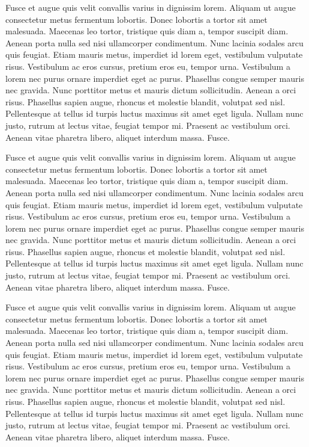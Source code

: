 Fusce et augue quis velit convallis varius in dignissim lorem. 
Aliquam ut augue consectetur metus fermentum lobortis. Donec lobortis 
a tortor sit amet malesuada. Maecenas leo tortor, tristique quis 
diam a, tempor suscipit diam. Aenean porta nulla sed nisi ullamcorper 
condimentum. Nunc lacinia sodales arcu quis feugiat. Etiam mauris 
metus, imperdiet id lorem eget, vestibulum vulputate risus. Vestibulum 
ac eros cursus, pretium eros eu, tempor urna. Vestibulum a lorem 
nec purus ornare imperdiet eget ac purus. Phasellus congue semper 
mauris nec gravida. Nunc porttitor metus et mauris dictum sollicitudin.
Aenean a orci risus. Phasellus sapien augue, rhoncus et molestie blandit, 
volutpat sed nisl. Pellentesque at tellus id turpis luctus maximus 
sit amet eget ligula. Nullam nunc justo, rutrum at lectus vitae, 
feugiat tempor mi. Praesent ac vestibulum orci. Aenean vitae pharetra 
libero, aliquet interdum massa. Fusce.

Fusce et augue quis velit convallis varius in dignissim lorem. 
Aliquam ut augue consectetur metus fermentum lobortis. Donec lobortis 
a tortor sit amet malesuada. Maecenas leo tortor, tristique quis 
diam a, tempor suscipit diam. Aenean porta nulla sed nisi ullamcorper 
condimentum. Nunc lacinia sodales arcu quis feugiat. Etiam mauris 
metus, imperdiet id lorem eget, vestibulum vulputate risus. Vestibulum 
ac eros cursus, pretium eros eu, tempor urna. Vestibulum a lorem 
nec purus ornare imperdiet eget ac purus. Phasellus congue semper 
mauris nec gravida. Nunc porttitor metus et mauris dictum sollicitudin.
Aenean a orci risus. Phasellus sapien augue, rhoncus et molestie blandit, 
volutpat sed nisl. Pellentesque at tellus id turpis luctus maximus 
sit amet eget ligula. Nullam nunc justo, rutrum at lectus vitae, 
feugiat tempor mi. Praesent ac vestibulum orci. Aenean vitae pharetra 
libero, aliquet interdum massa. Fusce.

Fusce et augue quis velit convallis varius in dignissim lorem. 
Aliquam ut augue consectetur metus fermentum lobortis. Donec lobortis 
a tortor sit amet malesuada. Maecenas leo tortor, tristique quis 
diam a, tempor suscipit diam. Aenean porta nulla sed nisi ullamcorper 
condimentum. Nunc lacinia sodales arcu quis feugiat. Etiam mauris 
metus, imperdiet id lorem eget, vestibulum vulputate risus. Vestibulum 
ac eros cursus, pretium eros eu, tempor urna. Vestibulum a lorem 
nec purus ornare imperdiet eget ac purus. Phasellus congue semper 
mauris nec gravida. Nunc porttitor metus et mauris dictum sollicitudin.
Aenean a orci risus. Phasellus sapien augue, rhoncus et molestie blandit, 
volutpat sed nisl. Pellentesque at tellus id turpis luctus maximus 
sit amet eget ligula. Nullam nunc justo, rutrum at lectus vitae, 
feugiat tempor mi. Praesent ac vestibulum orci. Aenean vitae pharetra 
libero, aliquet interdum massa. Fusce.

\newpage
\thispagestyle{empty}
\mbox{}

\newpage